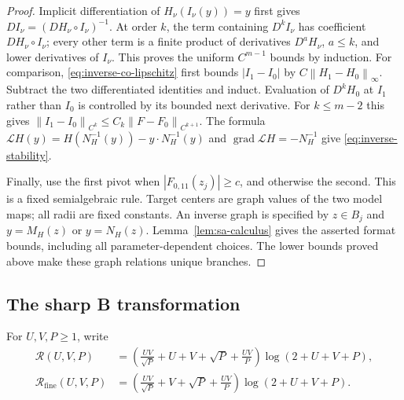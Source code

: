 \documentclass[11pt,a4paper]{article}
\numberwithin{equation}{section}
\theoremstyle{remark}
\newcommand{\norm}[1]{\left\lVert #1\right\rVert}
\DeclareMathOperator{\grad}{grad}
\newcommand{\Leg}{\mathcal L}
\newcommand{\Rfine}{\mathcal R_{\mathrm{fine}}}
\begin{document}
\begin{proof}
Implicit differentiation of $H_\nu(I_\nu(y))=y$ first gives
$DI_\nu=(DH_\nu\circ I_\nu)^{-1}$. At order $k$, the term containing
$D^kI_\nu$ has coefficient $DH_\nu\circ I_\nu$; every other term is a
finite product of derivatives $D^aH_\nu$, $a\le k$, and lower derivatives
of $I_\nu$. This proves the uniform $C^{m-1}$ bounds by induction.
For comparison, \eqref{eq:inverse-co-lipschitz} first bounds
$|I_1-I_0|$ by $C\norm{H_1-H_0}_\infty$. Subtract the two differentiated
identities and induct. Evaluation of $D^kH_0$ at $I_1$ rather than $I_0$
is controlled by its bounded next derivative. For $k\le m-2$ this gives
$\norm{I_1-I_0}_{C^k}\le C_k\norm{F-F_0}_{C^{k+1}}$.
The formula
$\Leg H(y)=H(N_H^{-1}(y))-y\cdot N_H^{-1}(y)$ and
$\grad\Leg H=-N_H^{-1}$ give \eqref{eq:inverse-stability}.

Finally, use the first pivot when $|F_{0,11}(z_j)|\ge c$, and otherwise
the second. This is a fixed semialgebraic rule. Target centers are graph
values of the two model maps; all radii are fixed constants. An inverse
graph is specified by $z\in B_j$ and $y=M_H(z)$ or $y=N_H(z)$.
Lemma~\ref{lem:sa-calculus} gives the asserted format bounds, including
all parameter-dependent choices. The lower bounds proved above make
these graph relations unique branches.
\end{proof}


\subsection{The sharp B transformation}

For $U,V,P\ge1$, write
\begin{align}
 \mathcal R(U,V,P)
 &=\left(\frac{UV}{\sqrt P}+U+V+\sqrt P+\frac{UV}{P}\right)
       \log(2+U+V+P),\label{eq:R}\\
 \Rfine(U,V,P)
 &=\left(\frac{UV}{\sqrt P}+V+\sqrt P+\frac{UV}{P}\right)
       \log(2+U+V+P).\label{eq:Rfine}
\end{align}
\end{document}
